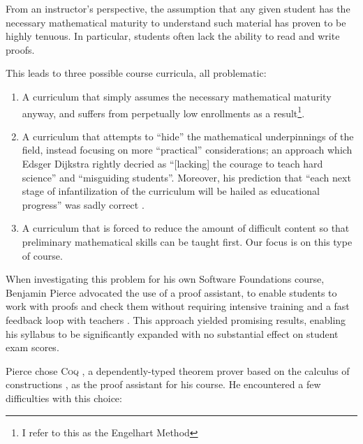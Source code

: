 \documentclass[a4paper]{jfp}
\begin{document}
From an instructor's perspective, the assumption that any given student has the necessary mathematical
maturity to understand such material has proven to be highly tenuous. In particular, students often
lack the ability to read and write proofs.

This leads to three possible course curricula, all problematic:

\begin{enumerate}
        \item A curriculum that simply assumes the necessary mathematical maturity anyway,
              and suffers from perpetually low enrollments as a result\footnote{I
              refer to this as the Engelhart Method}.
        \item A curriculum that attempts to ``hide'' the mathematical
                underpinnings of the field, instead focusing on more
                ``practical'' considerations; an approach which Edsger Dijkstra rightly
                decried as ``[lacking] the courage
                to teach hard science'' and ``misguiding students''. Moreover, his prediction
                that ``each next stage of infantilization of the
                curriculum will be hailed as educational progress'' was sadly correct \cite{Dijkstra:tg}.
        \item A curriculum that is forced to reduce the amount of difficult content so that
              preliminary mathematical skills can be taught first. Our focus is on this type of
              course.
\end{enumerate}

When investigating this problem for his own Software
Foundations course, Benjamin Pierce advocated the use of a proof assistant, to enable students to
work with proofs and check them without requiring intensive training and a fast feedback loop with
teachers \cite{Pierce:2009:LUT:1596550.1596552}. This approach yielded promising results, enabling his syllabus to be significantly
expanded with no substantial effect on student exam scores.

Pierce chose \textsc{Coq} \cite{Team:vw}, a
dependently-typed theorem prover based on the calculus of constructions \cite{Coquand86ananalysis}, as the
proof assistant for his course. He encountered a few difficulties with this choice:
\end{document}

